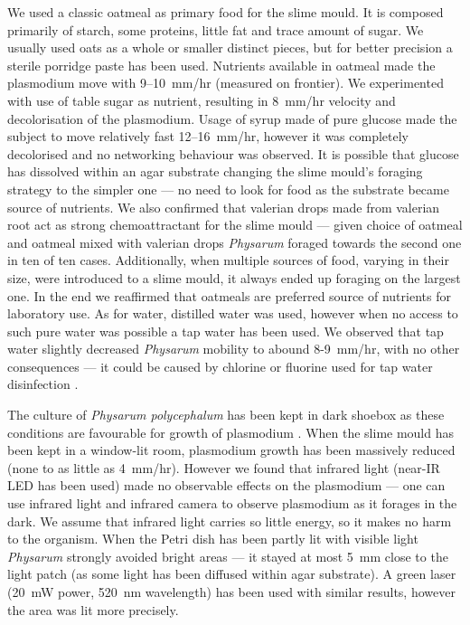 We used a classic oatmeal as primary food for the slime mould. It is composed primarily of starch, some proteins, little fat and trace amount of sugar. We usually used oats as a whole or smaller distinct pieces, but for better precision a sterile porridge paste has been used. Nutrients available in oatmeal made the plasmodium move with 9--10~mm/hr (measured on frontier). We experimented with use of table sugar as nutrient, resulting in 8~mm/hr velocity and decolorisation of the plasmodium. Usage of syrup made of pure glucose made the subject to move relatively fast 12--16~mm/hr, however it was completely decolorised and no networking behaviour was observed. It is possible that glucose has dissolved within an agar substrate changing the slime mould's foraging strategy to the simpler one --- no need to look for food as the substrate became source of nutrients. We also confirmed that valerian drops made from valerian root act as strong chemoattractant for the slime mould \cite{adamatzky2012physarum} --- given choice of oatmeal and oatmeal mixed with valerian drops \textit{Physarum} foraged towards the second one in ten of ten cases. Additionally, when multiple sources of food, varying in their size, were introduced to a slime mould, it always ended up foraging on the largest one. In the end we reaffirmed that oatmeals are preferred source of nutrients for laboratory use. As for water, distilled water was used, however when no access to such pure water was possible a tap water has been used. We observed that tap water slightly decreased \textit{Physarum} mobility to abound 8-9~mm/hr, with no other consequences --- it could be caused by chlorine or fluorine used for tap water disinfection \cite{uden1983chlorinated}.

The culture of \textit{Physarum polycephalum} has been kept in dark shoebox as these conditions are favourable for growth of plasmodium \cite{adamatzky2010physarum}. When the slime mould has been kept in a window-lit room, plasmodium growth has been massively reduced (none to as little as 4~mm/hr). However we found that infrared light (near-IR LED has been used) made no observable effects on the plasmodium --- one can use infrared light and infrared camera to observe plasmodium as it forages in the dark. We assume that infrared light carries so little energy, so it makes no harm to the organism. When the Petri dish has been partly lit with visible light \textit{Physarum} strongly avoided bright areas --- it stayed at most 5~mm close to the light patch (as some light has been diffused within agar substrate). A green laser (20~mW power, 520~nm wavelength) has been used with similar results, however the area was lit more precisely. 

